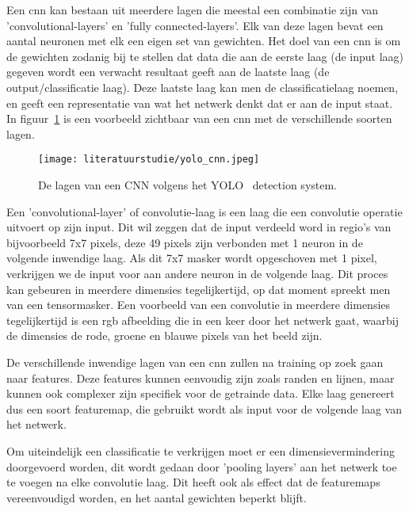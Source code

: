             Een \gls{cnn} kan bestaan uit meerdere lagen die meestal een combinatie zijn van 'convolutional-layers' en 'fully connected-layers'.
            Elk van deze lagen bevat een aantal neuronen met elk een eigen set van gewichten.
            Het doel van een \gls{cnn} is om de gewichten zodanig bij te stellen dat data die aan de eerste laag (de input laag) gegeven wordt een verwacht resultaat geeft aan de laatste laag (de output/classificatie laag).
            Deze laatste laag kan men de classificatielaag noemen, en geeft een representatie van wat het netwerk denkt dat er aan de input staat.
            In figuur~\ref{fig:yolo_cnn} is een voorbeeld zichtbaar van een \gls{cnn} met de verschillende soorten lagen.

            \begin{figure}[!htb]
                \centering
                \texttt{[image: literatuurstudie/yolo\_cnn.jpeg]}
                \caption{De lagen van een CNN volgens het YOLO~\cite{Redmon_2016} detection system.}
                \label{fig:yolo_cnn}
            \end{figure}

            Een 'convolutional-layer' of convolutie-laag is een laag die een convolutie operatie uitvoert op zijn input.
            Dit wil zeggen dat de input verdeeld word in regio's van bijvoorbeeld 7x7 pixels, deze 49 pixels zijn verbonden met 1 neuron in de volgende inwendige laag.
            Als dit 7x7 masker wordt opgeschoven met 1 pixel, verkrijgen we de input voor aan andere neuron in de volgende laag.
            Dit proces kan gebeuren in meerdere dimensies tegelijkertijd, op dat moment spreekt men van een tensormasker.
            Een voorbeeld van een convolutie in meerdere dimensies tegelijkertijd is een \gls{rgb} afbeelding die in een keer door het netwerk gaat, waarbij de dimensies de rode, groene en blauwe pixels van het beeld zijn.

            De verschillende inwendige lagen van een \gls{cnn} zullen na training op zoek gaan naar features. Deze features kunnen eenvoudig zijn zoals randen en lijnen, maar kunnen ook complexer zijn specifiek voor de getrainde data.
            Elke laag genereert dus een soort featuremap, die gebruikt wordt als input voor de volgende laag van het netwerk.

            Om uiteindelijk een classificatie te verkrijgen moet er een dimensievermindering doorgevoerd worden, dit wordt gedaan door 'pooling layers' aan het netwerk toe te voegen na elke convolutie laag.
            Dit heeft ook als effect dat de featuremaps vereenvoudigd worden, en het aantal gewichten beperkt blijft.


